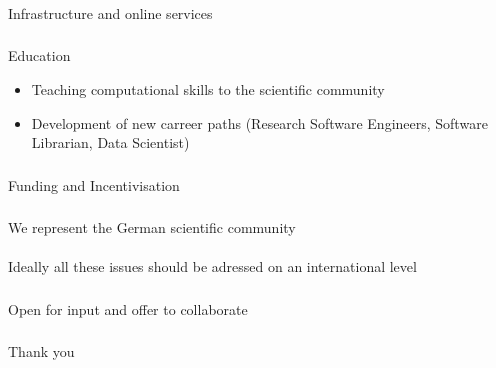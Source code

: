 \documentclass{beamer}
\begin{document}
\begin{frame}
  \frametitle{}
  \begin{block}{}
    \begin{center}
      Infrastructure and online services
    \end{center}
  \end{block}
\end{frame}

\begin{frame}
  \frametitle{}
  \begin{block}{}
    \begin{center}
      Education
      \begin{itemize}
      \item Teaching computational skills to the scientific community
      \item Development of new carreer paths (Research Software
        Engineers, Software Librarian, Data Scientist)
      \end{itemize}
    \end{center}
  \end{block}
\end{frame}

\begin{frame}
  \frametitle{}
  \begin{block}{}
    \begin{center}
      Funding and Incentivisation
    \end{center}
  \end{block}
\end{frame}

\begin{frame}
  \frametitle{}
  \begin{block}{}
    \begin{center}
      We represent the German scientific community\\
      \ \\
      \pause
      Ideally all these issues should be adressed on an international level
    \end{center}
  \end{block}
\end{frame}

\begin{frame}
  \frametitle{}
  \begin{block}{}
    \begin{center}
      Open for input and offer to collaborate
    \end{center}
  \end{block}
\end{frame}

\begin{frame}
  \frametitle{}
  \begin{block}{}
    \begin{center}
      Thank you
      \end{center}    
  \end{block}
\end{frame}
\end{document}
